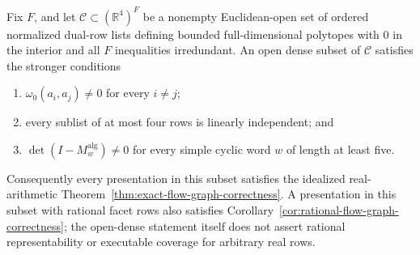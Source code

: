 \begin{proposition}
\label{prop:flow-graph-presentation-chamber-genericity}
Fix \(F\), and let \(\mathcal C\subset(\mathbb R^4)^F\) be a nonempty
Euclidean-open set of ordered normalized dual-row lists defining bounded
full-dimensional polytopes with \(0\) in the interior and all \(F\)
inequalities irredundant.  An open dense subset of \(\mathcal C\) satisfies
the stronger conditions
\begin{enumerate}
  \item \(\omega_0(a_i,a_j)\ne0\) for every \(i\ne j\);
  \item every sublist of at most four rows is linearly independent; and
  \item \(\det(I-M_w^{\mathrm{alg}})\ne0\) for every simple cyclic word \(w\)
    of length at least five.
\end{enumerate}
Consequently every presentation in this subset satisfies the idealized
real-arithmetic Theorem~\ref{thm:exact-flow-graph-correctness}.  A presentation
in this subset with rational facet rows also satisfies
Corollary~\ref{cor:rational-flow-graph-correctness}; the open-dense statement
itself does not assert rational representability or executable coverage for
arbitrary real rows.
\end{proposition}

